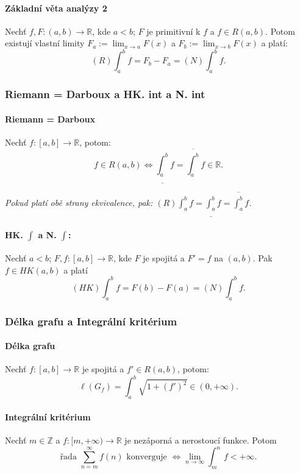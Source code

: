 \documentclass[10pt,a4paper]{article}
\newcommand{\Z}{{\mathbb{Z}}}
\newcommand{\R}{{\mathbb{R}}}
\begin{document}
\paragraph*{Základní věta analýzy 2} Nechť $f, F: (a, b) \to \R$, kde $a<b$; $F$ je primitivní k $f$ a $f\in R(a,b)$. 
Potom existují vlastní limity $F_a := \displaystyle \lim_{x\to a}F(x)$ a $\displaystyle F_b := \lim_{x\to b}F(x)$ a platí:
\[
    (R) \int_{a}^{b} f = F_b - F_a = (N) \int_{a}^{b} f.
\]

\subsubsection{Riemann = Darboux a HK. int a N. int}

\paragraph*{Riemann = Darboux} Nechť $f:[a,b] \to \R$, potom:
\[
    f\in R(a,b) \iff \underline{\int_{a}^{b}}f = \overline{\int_{a}^{b}}f \in \R.
\] 

\textit{Pokud platí obě strany ekvivalence, pak: $\displaystyle (R) \int_{a}^{b} f = \underline{\int_{a}^{b}}f = \overline{\int_{a}^{b}}f$.}

\paragraph*{HK. \(\int \) a N. \(\int \):} Nechť $a<b$; $F,f:[a,b]\to \R$, kde $F$ je spojitá a $F' = f$ na $(a,b)$. 
Pak $f\in HK(a,b)$ a platí
\[
    (HK) \int_{a}^{b}f= F(b) - F(a) = (N) \int_{a}^{b} f.
\]

\subsubsection{Délka grafu  a Integrální kritérium}

\paragraph*{Délka grafu} Nechť $f:[a,b]\to \R$ je spojitá a $f'\in R(a,b)$, potom:
\[
    \ell(G_f)=\int_{a}^{b}\sqrt{1 + (f')^2} \in (0, +\infty).
\]
\paragraph*{Integrální kritérium} Nechť $m\in \Z$ a $f:[m, +\infty) \to \R$ je nezáporná a nerostoucí funkce. Potom
\[
    \text{řada }\sum_{n=m}^{\infty}f(n) \text{ konverguje } \iff \lim_{n\to \infty} \int_{m}^{n} f < +\infty.
\]
\end{document}
